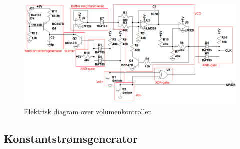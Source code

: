 
\begin{figure}[h]
\centering
\includegraphics[width=\textwidth]{teknisk/volumenkontrol/diagram.png}
\caption{Elektrisk diagram over volumenkontrollen}
\label{fig:volumenkontrol_diagram}
\end{figure}

\subsection*{Konstantstrømsgenerator}
\label{volumenkontrol-design-konstantstroemsgenerator}

